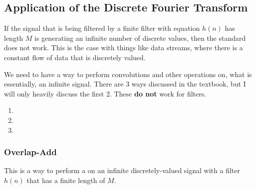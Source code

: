 \subsection{Application of the Discrete Fourier Transform}\label{subsec:DFT_Application}
If the signal that is being filtered by a finite filter with equation $h(n)$ has length $M$ is generating an infinite number of discrete values, then the standard  does not work.
This is the case with things like data streams, where there is a constant flow of data that is discretely valued.

We need to have a way to perform convolutions and other operations on, what is essentially, an infinite signal.
There are 3 ways discussed in the textbook, but I will only heavily discuss the first 2.
These \textbf{do not} work for  filters.
\begin{enumerate}[noitemsep]
\item {}
\item {}
\item {}
\end{enumerate}

\subsubsection{Overlap-Add}\label{subsubsec:DFT_Application-Overlap_Add}
This is a way to perform a  on an infinite discretely-valued signal with a filter $h(n)$ that has a finite length of $M$.

